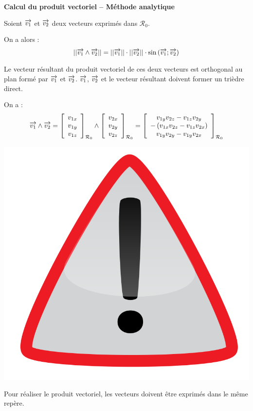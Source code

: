 \documentclass[10pt,oneside]{article}
\begin{document}
\begin{methode}
\textbf{Calcul du produit vectoriel -- Méthode analytique}

Soient $\overrightarrow{v_1}$ et $\overrightarrow{v_2}$ deux vecteurs exprimés dans $\mathcal{R}_0$. 

On a alors :
$$
||\overrightarrow{v_1} \wedge \overrightarrow{v_2}|| = ||\overrightarrow{v_1}|| \cdot ||\overrightarrow{v_2}|| \cdot \sin \left(\overrightarrow{v_1};\overrightarrow{v_2} \right) 
$$

Le vecteur résultant du produit vectoriel de ces deux vecteurs est orthogonal au plan formé par $\overrightarrow{v_1}$ et $\overrightarrow{v_2}$. $\overrightarrow{v_1}$, $\overrightarrow{v_2}$ et le vecteur résultant doivent former un trièdre direct. 

On a :
$$
\overrightarrow{v_1} \wedge \overrightarrow{v_2} 
= 
\left[
\begin{array}{c}
v_{1x}\\
v_{1y}\\
v_{1z}\\
\end{array}
\right]_{\mathcal{R}_0}
\wedge
\left[
\begin{array}{c}
v_{2x}\\
v_{2y}\\
v_{2z}\\
\end{array}
\right]_{\mathcal{R}_0}
=
\left[
\begin{array}{c}
v_{1y}v_{2z}-v_{1z}v_{2y}\\
-\left( v_{1x}v_{2z}-v_{1z}v_{2x}\right)\\
v_{1y}v_{2y}-v_{1y}v_{2x}\\
\end{array}
\right]_{\mathcal{R}_0}
$$


\begin{minipage}[c]{.15\linewidth}
\begin{center}
\includegraphics[width=.8\textwidth]{png/warning3}
\end{center}
\end{minipage} \hfill
\begin{minipage}[c]{.8\linewidth}
Pour réaliser le produit vectoriel, les vecteurs doivent être exprimés dans le même repère.
\end{minipage}
\end{methode}
\end{document}
